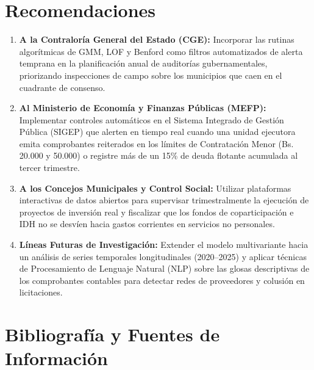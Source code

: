 \documentclass[11pt,a4paper]{article}
\begin{document}
\section{Recomendaciones}
\begin{enumerate}[label=\textbf{\arabic*.}]
    \item \textbf{A la Contraloría General del Estado (CGE):} Incorporar las rutinas algorítmicas de GMM, LOF y Benford como filtros automatizados de alerta temprana en la planificación anual de auditorías gubernamentales, priorizando inspecciones de campo sobre los municipios que caen en el cuadrante de consenso.
    \item \textbf{Al Ministerio de Economía y Finanzas Públicas (MEFP):} Implementar controles automáticos en el Sistema Integrado de Gestión Pública (SIGEP) que alerten en tiempo real cuando una unidad ejecutora emita comprobantes reiterados en los límites de Contratación Menor (Bs. 20.000 y 50.000) o registre más de un 15\% de deuda flotante acumulada al tercer trimestre.
    \item \textbf{A los Concejos Municipales y Control Social:} Utilizar plataformas interactivas de datos abiertos para supervisar trimestralmente la ejecución de proyectos de inversión real y fiscalizar que los fondos de coparticipación e IDH no se desvíen hacia gastos corrientes en servicios no personales.
    \item \textbf{Líneas Futuras de Investigación:} Extender el modelo multivariante hacia un análisis de series temporales longitudinales (2020--2025) y aplicar técnicas de Procesamiento de Lenguaje Natural (NLP) sobre las glosas descriptivas de los comprobantes contables para detectar redes de proveedores y colusión en licitaciones.
\end{enumerate}

\section{Bibliografía y Fuentes de Información}


\end{document}
